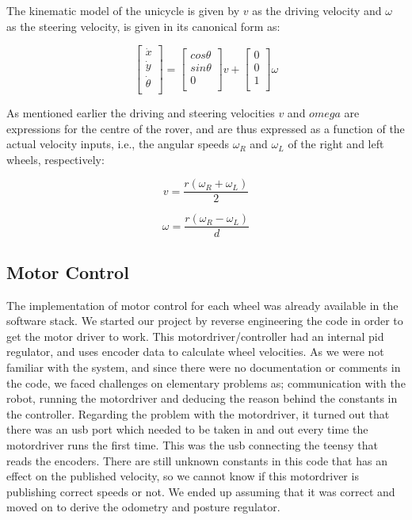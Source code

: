 \documentclass[a4paper,10pt]{article}
\begin{document}
The kinematic model of the unicycle is given by $v$ as the driving velocity and $\omega$ as the steering velocity,
is given in its canonical form as:

\begin{equation}
	\begin{bmatrix}
	\dot{x}\\ 
	\dot{y}\\
	\dot{\theta}\\  
	\end{bmatrix}
	=
	\begin{bmatrix}
	cos\theta\\ 
	sin\theta\\
	0\\  
	\end{bmatrix}v
	+
	\begin{bmatrix}
	0\\ 
	0\\
	1\\  
	\end{bmatrix}\omega
\end{equation}


As mentioned earlier the driving and steering velocities $v$ and $omega$ are expressions for the centre of the rover, and are thus expressed as a function of the actual velocity inputs, i.e., 
the angular speeds $\omega_{R}$ and $\omega_{L}$ of the right and left wheels, respectively:

		\begin{equation} \label{eq:v1}
			v=\frac{r(\omega_R +\omega_L)}{2}
		\end{equation}

		\begin{equation} \label{eq:omega1}
			\omega=\frac{r(\omega_R -\omega_L)}{d}
		\end{equation}


\subsection{Motor Control}
	The implementation of motor control for each wheel was already available in the software stack. 
	We started our project by reverse engineering the code in order to get the motor driver to work.
	This motordriver/controller had an internal pid regulator, and uses encoder data to calculate wheel velocities.
	As we were not familiar with the system, and since there were no documentation or comments in the code, we faced challenges on elementary problems as; 
	communication with the robot, running the motordriver and deducing the reason behind the constants in the controller.
	Regarding the problem with the motordriver, it turned out that there was an usb port which needed to be taken in and out every time the motordriver runs the first time. 
	This was the usb connecting the teensy that reads the encoders. 
	There are still unknown constants in this code that has an effect on the published velocity, 
	so we cannot know if this motordriver is publishing correct speeds or not. 
	We ended up assuming that it was correct and moved on to derive the odometry and posture regulator.
	
\end{document}
